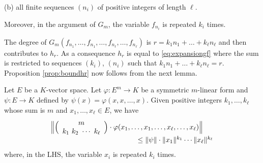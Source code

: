 \documentclass{sig-alternate}
\def\binom#1#2{\Big(\begin{array}{cc} #1 \\ #2 \end{array}\Big)}
\begin{document}
\noindent
(b) all finite sequences $(n_i)$ of positive integers of length
$\ell$.

\noindent
Moreover, in the argument of $G_m$, the variable $f_{n_i}$ 
is repeated $k_i$ times.

The degree of $G_m(f_{n_1}, \ldots, f_{n_1}, \ldots, f_{n_\ell},
\ldots, f_{n_\ell})$ is $r = k_1 n_1 + \ldots + k_\ell n_\ell$ and 
then contributes to $h_r$. As a consequence $h_r$ is equal to 
\eqref{eq:expansiongf} where the sum is restricted to sequences
$(k_i)$, $(n_i)$ such that $k_1 n_1 + \ldots + k_\ell n_\ell = r$.
Proposition \ref{prop:boundhr} now follows from the next lemma.

\begin{lem}
Let $E$ be a $K$-vector space. Let $\varphi : E^m \to 
K$ be a symmetric $m$-linear form and $\psi: E \to K$ defined by 
$\psi(x) = \varphi(x, x, \ldots, x)$.
Given positive integers $k_1, \ldots, k_\ell$ whose sum is $m$ and 
$x_1, \ldots, x_\ell \in E$, we have
$$\begin{array}{l}
\Big\Vert \binom m {k_1 \,\, k_2 \,\, \cdots \,\, k_\ell} \cdot
\varphi(x_1, \ldots, x_1, \ldots, x_\ell, \ldots,
x_\ell) \Big\Vert  \\
\hspace{4.3cm} \leq \Vert \psi \Vert \cdot \Vert x_1 \Vert^{k_1} \cdots
 \Vert x_\ell \Vert^{k_\ell}
\end{array}$$
where, in the LHS, the variable $x_i$ is repeated $k_i$ times.
\end{lem}
\end{document}
